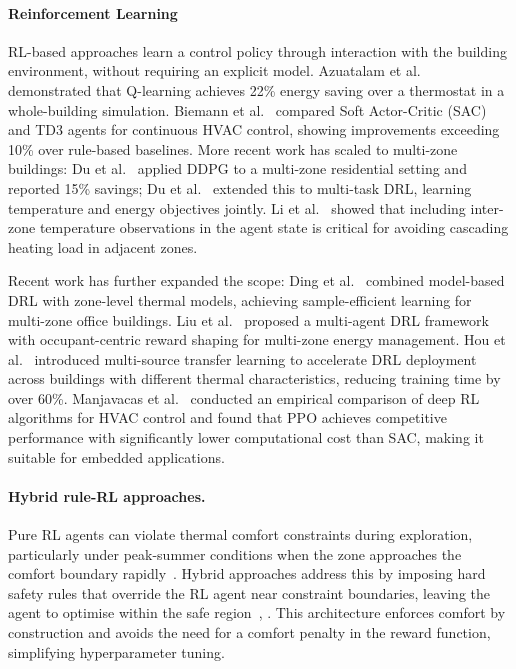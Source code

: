 \documentclass[3p,number]{elsarticle}
\begin{document}
\paragraph{Reinforcement Learning}
RL-based approaches learn a control policy through interaction with the building environment, without requiring an explicit model.
Azuatalam et al.~\cite{Azuatalam2020} demonstrated that Q-learning achieves 22\% energy saving over a thermostat in a whole-building simulation.
Biemann et al.~\cite{Biemann2021} compared Soft Actor-Critic (SAC) and TD3 agents for continuous HVAC control, showing improvements exceeding 10\% over rule-based baselines.
More recent work has scaled to multi-zone buildings: Du et al.~\cite{Du2021b} applied DDPG to a multi-zone residential setting and reported 15\% savings; Du et al.~\cite{Du2021a} extended this to multi-task DRL, learning temperature and energy objectives jointly.
Li et al.~\cite{Li2024MZ} showed that including inter-zone temperature observations in the agent state is critical for avoiding cascading heating load in adjacent zones.
 
Recent work has further expanded the scope: Ding et al.~\cite{Ding2024} combined model-based DRL with zone-level thermal models, achieving sample-efficient learning for multi-zone office buildings.
Liu et al.~\cite{Liu2024} proposed a multi-agent DRL framework with occupant-centric reward shaping for multi-zone energy management.
Hou et al.~\cite{Hou2024} introduced multi-source transfer learning to accelerate DRL deployment across buildings with different thermal characteristics, reducing training time by over 60\%.
Manjavacas et al.~\cite{Manjavacas2024} conducted an empirical comparison of deep RL algorithms for HVAC control and found that PPO achieves competitive performance with significantly lower computational cost than SAC, making it suitable for embedded applications.
 
\paragraph{Hybrid rule-RL approaches.}
Pure RL agents can violate thermal comfort constraints during exploration, particularly under peak-summer conditions when the zone approaches the comfort boundary rapidly~\cite{Xu2025}.
Hybrid approaches address this by imposing hard safety rules that override the RL agent near constraint boundaries, leaving the agent to optimise within the safe region~\cite{Solinas2024}, \cite{Xu2025}.
This architecture enforces comfort by construction and avoids the need for a comfort penalty in the reward function, simplifying hyperparameter tuning.
 
\end{document}
